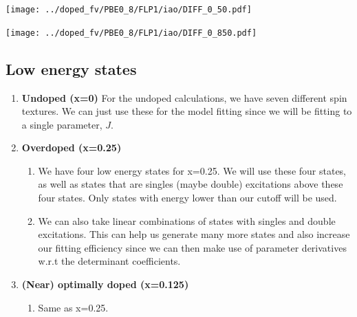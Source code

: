 \documentclass{article}
\begin{document}
\begin{enumerate}
\begin{enumerate}
\texttt{[image: ../doped\_fv/PBE0\_8/FLP1/iao/DIFF\_0\_50.pdf]} 
\linebreak

\texttt{[image: ../doped\_fv/PBE0\_8/FLP1/iao/DIFF\_0\_850.pdf]}

\end{enumerate}
\end{enumerate}

\color{blue}
\subsection{Low energy states}
\begin{enumerate}
\item \textbf{Undoped (x=0)} For the undoped calculations, we have seven different spin textures. We can just use these for the model fitting since we will be fitting to a single parameter, $J$.

\item \textbf{Overdoped (x=0.25)}
\begin{enumerate}
\item We have four low energy states for x=0.25. We will use these four states, as well as states that are singles (maybe double) excitations above these four states. Only states with energy lower than our cutoff will be used.
\item We can also take linear combinations of states with singles and double excitations. This can help us generate many more states and also increase our fitting efficiency since we can then make use of parameter derivatives w.r.t the determinant coefficients.
\end{enumerate}

\item \textbf{(Near) optimally doped (x=0.125)}
\begin{enumerate}
\item Same as x=0.25.
\end{enumerate}
\end{enumerate}
\end{document}
